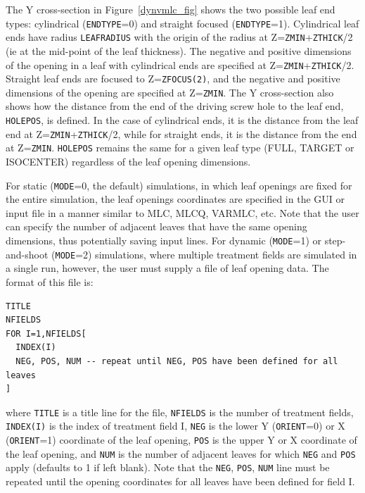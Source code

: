 \documentclass[12pt,twoside]{article}
\begin{document}
The Y cross-section in Figure~\ref{dynvmlc_fig} shows the
two possible leaf end types: cylindrical ({\tt ENDTYPE}=0) and
straight focused ({\tt ENDTYPE}=1).  Cylindrical leaf ends have radius
{\tt LEAFRADIUS} with the origin of the radius at
Z={\tt ZMIN}+{\tt ZTHICK}/2 (ie at the mid-point of the leaf thickness).
The negative and positive dimensions of the opening in a leaf with
cylindrical ends are specified at Z={\tt ZMIN}+{\tt ZTHICK}/2.  Straight
leaf ends are focused to Z={\tt ZFOCUS(2)}, and the negative and positive
dimensions of the opening are specified at Z={\tt ZMIN}.
The Y cross-section also shows how
the distance from the end of the driving screw hole to the leaf end,
{\tt HOLEPOS}, is defined.  In the case of cylindrical ends, it is the
distance from
the leaf end at Z={\tt ZMIN}+{\tt ZTHICK}/2, while for straight ends, it is the
distance from the end at Z={\tt ZMIN}.  {\tt HOLEPOS} remains the
same for a given leaf type (FULL, TARGET or ISOCENTER) regardless of the
leaf opening dimensions.

For static ({\tt MODE}=0, the default) simulations, in which leaf openings are
fixed for the
entire simulation, the leaf openings coordinates are specified
in the GUI or input file in a manner similar to MLC, MLCQ, VARMLC, etc.
Note that the user can
specify the number of adjacent leaves that have the same opening dimensions,
thus potentially saving input lines.  For dynamic ({\tt MODE}=1) or
step-and-shoot ({\tt MODE}=2) simulations, where multiple treatment fields
are simulated in a single run, however, the user must supply
a file of leaf opening data.  The format of this file is:
\begin{verbatim}
TITLE
NFIELDS
FOR I=1,NFIELDS[
  INDEX(I)
  NEG, POS, NUM -- repeat until NEG, POS have been defined for all leaves
]
\end{verbatim}
where {\tt TITLE} is a title line for the file, {\tt NFIELDS} is the number of treatment fields, {\tt INDEX(I)} is
the index of treatment field I, {\tt NEG} is the lower
Y ({\tt ORIENT}=0) or X ({\tt ORIENT}=1) coordinate of the leaf opening,
{\tt POS} is the upper Y or X coordinate of the leaf opening, and
{\tt NUM} is the number of adjacent leaves for which {\tt NEG} and
{\tt POS} apply (defaults to 1 if left blank).  Note that the
{\tt NEG}, {\tt POS}, {\tt NUM} line must be repeated until the opening
coordinates for all leaves have been defined for field I.
\end{document}
